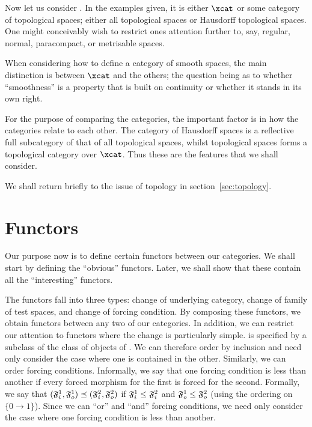 \documentclass[%
a4paper,%
arxiv,%
defaults
]{myclass}
\begin{document}
Now let us consider \ucat.
In the examples given, it is either \(\xcat\) or some category of topological spaces; either all topological spaces or Hausdorff topological spaces.
One might conceivably wish to restrict ones attention further to, say, regular, normal, paracompact, or metrisable spaces.

When considering how to define a category of smooth spaces, the main distinction is between \(\xcat\) and the others; the question being as to whether ``smoothness'' is a property that is built on continuity or whether it stands in its own right.

For the purpose of comparing the categories, the important factor is in how the categories relate to each other.
The category of Hausdorff spaces is a reflective full subcategory of that of all topological spaces, whilst topological spaces forms a topological category over \(\xcat\).
Thus these are the features that we shall consider.

We shall return briefly to the issue of topology in section~\ref{sec:topology}.

\section{Functors}
\label{sec:functor}


Our purpose now is to define certain functors between our categories.
We shall start by defining the ``obvious'' functors.
Later, we shall show that these contain all the ``interesting'' functors.

The functors fall into three types: change of underlying category, change of family of test spaces, and change of forcing condition.
By composing these functors, we obtain functors between any two of our categories.
In addition, we can restrict our attention to functors where the change is particularly simple.
\tcatu is specified by a subclass of the class of objects of \mcat.
We can therefore order \tcats by inclusion and need only consider the case where one is contained in the other.
Similarly, we can order forcing conditions.
Informally, we say that one forcing condition is less than another if every forced morphism for the first is forced for the second.
Formally, we say that \((\iforce^1, \oforce^1) \preceq (\iforce^2, \oforce^2)\) if \(\iforce^1 \le \iforce^2\) and \(\oforce^1 \le \oforce^2\) (using the ordering on \(\{0 \to 1\}\)).
Since we can ``or'' and ``and'' forcing conditions, we need only consider the case where one forcing condition is less than another.
\end{document}
